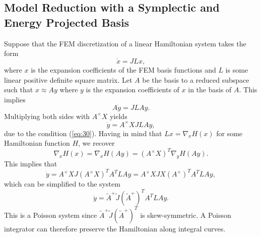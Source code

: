 \documentclass[12pt]{article}
\begin{document}
\subsection{Model Reduction with a Symplectic and Energy Projected Basis}
Suppose that the FEM discretization of a linear Hamiltonian system takes the form
\begin{equation}
	\dot x = J L x,
\end{equation}
where $x$ is the expansion coefficients of the FEM basis functions and $L$ is some linear positive definite square 
 matrix. Let $A$ be the basis to a reduced subspace such that $x \approx Ay$ where $y$ is the expansion coefficients of $x$ in the basis of $A$. This implies
\begin{equation}
	A \dot y = J L A y.
\end{equation}
Multiplying both sides with $A^\times X$ yields
\begin{equation}
	\dot y = A^\times X J L A y,
\end{equation}
due to the condition (\ref{eq:30}). Having in mind that $L x = \nabla_x H(x)$ for some Hamiltonian function $H$, we recover
\begin{equation}
	\nabla_x H(x) = \nabla_x H(Ay) = ( A^\times X )^T \nabla_y H(Ay).
\end{equation}
This implies that
\begin{equation}
	\dot y = A^\times X J (A^\times X)^T A^T L A y = A^\times X J X (A^\times)^T A^T L A y,
\end{equation}
which can be simplified to the system
\begin{equation} \label{eq:reduced-poisson}
	\dot y = \tilde A ^+ \tilde J (\tilde A ^+)^T  A^T L A y.
\end{equation}
This is a Poisson system since $\tilde A ^+ \tilde J (\tilde A ^+)^T$ is skew-symmetric. A Poisson integrator can therefore preserve the Hamiltonian along integral curves.
\end{document}
